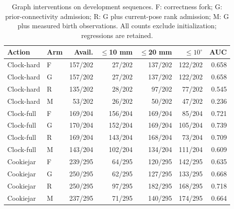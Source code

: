\begin{table}[t]
\centering\footnotesize
\caption{Graph interventions on development sequences. F: correctness fork; G: prior-connectivity admission; R: G plus current-pose rank admission; M: G plus measured birth observations. All counts exclude initialization; regressions are retained.}
\label{tab:anchor-admission}
\begin{tabular}{llrrrrr}\toprule
Action & Arm & Avail. & $\leq$10 mm & $\leq$20 mm & $\leq10^\circ$ & AUC\\\midrule
Clock-hard & F & 157/202 & 27/202 & 137/202 & 122/202 & 0.658\\
Clock-hard & G & 157/202 & 27/202 & 137/202 & 122/202 & 0.658\\
Clock-hard & R & 135/202 & 28/202 & 97/202 & 77/202 & 0.545\\
Clock-hard & M & 53/202 & 26/202 & 50/202 & 47/202 & 0.236\\
Clock-full & F & 169/204 & 156/204 & 169/204 & 85/204 & 0.721\\
Clock-full & G & 170/204 & 152/204 & 169/204 & 105/204 & 0.739\\
Clock-full & R & 169/204 & 143/204 & 168/204 & 73/204 & 0.709\\
Clock-full & M & 143/204 & 102/204 & 134/204 & 111/204 & 0.609\\
Cookiejar & F & 239/295 & 64/295 & 120/295 & 142/295 & 0.635\\
Cookiejar & G & 250/295 & 62/295 & 127/295 & 133/295 & 0.668\\
Cookiejar & R & 250/295 & 97/295 & 182/295 & 168/295 & 0.718\\
Cookiejar & M & 237/295 & 71/295 & 140/295 & 174/295 & 0.664\\
\bottomrule\end{tabular}\end{table}
